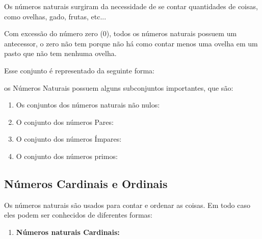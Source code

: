 \begin{multicols*}{2}
		Os números naturais surgiram da necessidade de se contar quantidades de coisas, como ovelhas, gado, frutas, etc...
		
		Com excessão do número zero (0), todos os números naturais possuem um antecessor, o zero não tem porque não há como contar menos uma ovelha em um pasto que não tem nenhuma ovelha.
		
		Esse conjunto é representado da seguinte forma:
		
		
		os Números Naturais possuem alguns subconjuntos importantes, que são:
		
		\begin{enumerate}
		
			\item Os conjuntos dos números naturais não nulos:
			
			
			\item O conjunto dos números Pares:
									
			
			\item O conjunto dos números Ímpares:
			
			
			\item O conjunto dos números primos:
			
			
		\end{enumerate}
			
			\subsection{Números Cardinais e Ordinais}
			
			Os números naturais são usados para contar e ordenar as coisas. Em todo caso eles podem ser conhecidos de diferentes formas:

			\begin{enumerate}
			
			\item \textbf{Números naturais Cardinais:}\\
			

\end{enumerate}
\end{multicols*}
